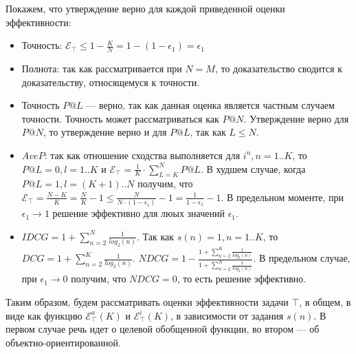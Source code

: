 Покажем, что утверждение верно для каждой приведенной оценки эффективности:
\begin{itemize}
\item Точность: $\mathcal{E}_{\top} \le 1 - \frac{K}{N} = 1 - (1 - \epsilon_1) = \epsilon_1$

\item Полнота: так как рассматривается при $N = M$, то доказательство сводится к доказательству, относящемуся к  точности.

\item Точность $P@L$ --- верно, так как данная оценка является частным случаем точности. Точность может рассматриваться как $P@N$.
Утверждение верно для $P@N$, то утверждение верно и для $P@L$, так как $L \le N$.

\item $AveP$: так как отношение сходства выполняется для $i^n, n=1..K$, то $P@L = 0, l=1..K$ и 
$\mathcal{E}_{\top} = \frac{1}{K} \cdot \sum \limits_{L=K}^{N} P@L$. В худшем случае, когда $P@L=1, l=(K+1)..N$ получим, что
$\mathcal{E}_{\top} = \frac{N-K}{K} = \frac{N}{K} - 1 \le \frac{N}{N \cdot (1 - \epsilon_1)} - 1 = \frac{1}{1 - \epsilon_1} - 1$.
В предельном моменте, при $\epsilon_1 \rightarrow 1$ решение эффективно для люых значений $\epsilon_1$.

\item $IDCG = 1 + \sum \limits_{n=2}^N \frac{1}{log_2(n)}$. Так как $s(n)=1, n=1..K$, то $DCG=1 + \sum \limits_{n=2}^K \frac{1}{log_2(n)}$.
$NDCG = 1 - \frac{1 + \sum \limits_{n=2}^K \frac{1}{log_2(n)}}{1 + \sum \limits_{n=2}^N \frac{1}{log_2(n)}}$. В предельном случае, при $\epsilon_1 \rightarrow 0$ получим, что $NDCG=0$, то есть решение эффективно.
\end{itemize}

Таким образом, будем рассматривать оценки эффективности задачи $\top$, в общем, в виде как функцию 
$\mathcal{E}^a_{\top}(K)$ и $\mathcal{E}^i_{\top}(K)$, в зависимости от задания $s(n)$. В первом случае речь идет о 
целевой обобщенной функции, во втором --- об объектно-ориентированной.
